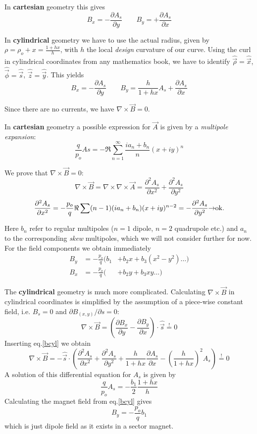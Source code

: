 \documentclass[12pt]{article}
\newcommand{\see}{\mbox{$\rightarrow$}}
\newcommand\beq{\begin{equation}}
\newcommand\eeq{\end{equation}}
\newcommand{\uvec}[1]{\mbox{$\hat{\vec{#1}}$}}
\begin{document}
In {\bf cartesian} geometry this gives
\beq
B_x=-\frac{\partial A_s}{\partial y}\qquad
B_y=+\frac{\partial A_s}{\partial x}
\eeq

In {\bf cylindrical} geometry we have to use the actual radius, given by
$\rho=\rho_o+x = \frac{1+hx}{h}$, with $h$ the local {\em design} curvature of our curve.
Using the curl in cylindrical coordinates from any mathematics book, we have to
identify $\uvec{\rho}=\uvec{x}$, $\uvec{\phi}=\uvec{s}$, $\uvec{z}=\uvec{y}$. This yields
\beq\label{bcyl}
B_x=-\frac{\partial A_s}{\partial y}\qquad
B_y=\frac{h}{1+hx}A_s+ \frac{\partial A_s}{\partial x}
\eeq

Since there are no currents, we have $\nabla\times\vec{B}=0$.

In {\bf cartesian} geometry a possible expression for $\vec{A}$ is given by a {\em multipole expansion}:
\beq\label{acarmul}
\frac{q}{p_o}As =  -\Re \sum_{n=1}^{\infty} \frac{ia_n+ b_n}{n} (x+iy)^n
\eeq

We prove that $\nabla\times\vec{B}=0$:
\[ \nabla\times\vec{B}= \nabla\times\nabla\times\vec{A}=
\frac{\partial^2 A_s}{\partial x^2}+\frac{\partial^2 A_s}{\partial y^2}
\]
\[
\frac{\partial^2 A_s}{\partial x^2} = -\frac{p_o}{q}\Re\sum (n-1)(ia_n+b_n)(x+iy)^{n-2}=
- \frac{\partial^2 A_s}{\partial y^2}\see {\rm ok.}
\]

Here $b_n$ refer to regular multipoles ($n=1$ dipole, $n=2$ quadrupole etc.) and $a_n$ to
the corresponding {\em skew} multipoles, which we will not consider further for now.
For the field components we obtain immediately
\beq
\begin{array}{lll}
B_y & = -\frac{p_o}{q} ( b_1 &  +b_2 x + b_3 (x^2-y^2) \dots ) \\
B_x & = -\frac{p_o}{q} ( &  + b_2 y + b_3 xy \dots )
\end{array}
\eeq

The {\bf cylindrical} geometry is much more complicated.
Calculating $\nabla\times \vec{B}$ in cylindrical coordinates is simplified by
the assumption of a piece-wise constant field, i.e. $B_s=0$ and $\partial B_(x,y)/\partial s=0$:
\[
\nabla\times \vec{B} = \left( \frac {\partial B_x} {\partial y}-\frac{\partial B_y}{\partial x}\right)\cdot \uvec{s}\stackrel{!}{=}0
\]
Inserting eq.\ref{bcyl} we obtain
\beq
\nabla\times \vec{B} = -\uvec{s}\cdot \left(
\frac{\partial^2 A_s}{\partial x^2}+\frac{\partial^2 A_s}{\partial y^2}
+ \frac{h}{1+hx}\frac{\partial A_s}{\partial x} - \left( \frac{h}{1+hx} \right)^2 A_s
\right)\stackrel{!}{=}0
\eeq
A solution of this differential equation for $A_s$ is given by~\cite{jbsls}
\beq\label{acyldip}
\frac{q}{p_o}A_s = -\frac{b_1}{2}\frac{1+hx}{h}
\eeq
Calculating the magnet field from eq.\ref{bcyl} gives
\beq
B_y= -\frac{p_o}{q} b_1
\eeq
which is just dipole field as it exists in a sector magnet.
\end{document}
